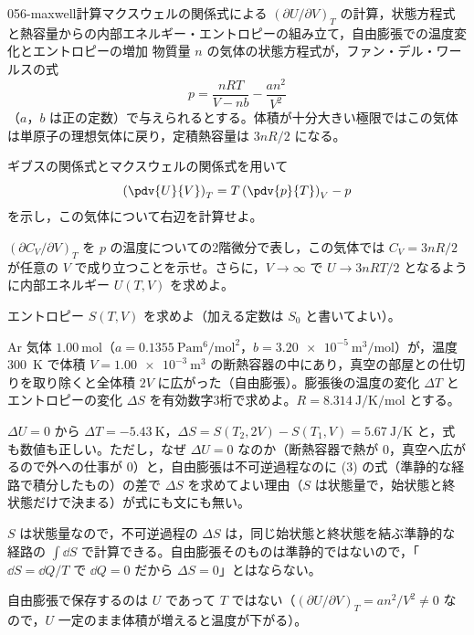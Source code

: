 \documentclass[uplatex,dvipdfmx,a4paper,11pt]{jsarticle}
\begin{document}
\mondaihen
{}
\begin{mondai}{056-maxwell}{計算}{マクスウェルの関係式による $(\partial U/\partial V)_{T}$ の計算，状態方程式と熱容量からの内部エネルギー・エントロピーの組み立て，自由膨張での温度変化とエントロピーの増加}
物質量 $n$ の気体の状態方程式が，ファン・デル・ワールスの式
\[ p=\frac{nRT}{V-nb}-\frac{an^{2}}{V^{2}} \]
（$a$，$b$ は正の定数）で与えられるとする。体積が十分大きい極限ではこの気体は単原子の理想気体に戻り，定積熱容量は $3nR/2$ になる。
\begin{shoumon}
  \item ギブスの関係式とマクスウェルの関係式を用いて
  \[ \left(\pdv{U}{V}\right)_{T}=T\left(\pdv{p}{T}\right)_{V}-p \]
  を示し，この気体について右辺を計算せよ。
  \item $(\partial C_{V}/\partial V)_{T}$ を $p$ の温度についての2階微分で表し，この気体では $C_{V}=3nR/2$ が任意の $V$ で成り立つことを示せ。さらに，$V\to\infty$ で $U\to3nRT/2$ となるように内部エネルギー $U(T,V)$ を求めよ。
  \item エントロピー $S(T,V)$ を求めよ（加える定数は $S_{0}$ と書いてよい）。
  \item Ar 気体 $\qty{1.00}{\mole}$（$a=\qty{0.1355}{\pascal\metre\tothe{6}\per\mole\squared}$，$b=\qty{3.20e-5}{\cubic\metre\per\mole}$）が，温度 \qty{300}{\kelvin} で体積 $V=\qty{1.00e-3}{\cubic\metre}$ の断熱容器の中にあり，真空の部屋との仕切りを取り除くと全体積 $2V$ に広がった（自由膨張）。膨張後の温度の変化 $\Delta T$ とエントロピーの変化 $\Delta S$ を有効数字3桁で求めよ。$R=\qty{8.314}{\joule\per\kelvin\per\mole}$ とする。
\end{shoumon}

\begin{kotaeran}
   $\Delta U=0$ から $\Delta T=\qty{-5.43}{\kelvin}$，$\Delta S=S(T_{2},2V)-S(T_{1},V)=\qty{5.67}{\joule\per\kelvin}$ と，式も数値も正しい。ただし，なぜ $\Delta U=0$ なのか（断熱容器で熱が 0，真空へ広がるので外への仕事が 0）と，自由膨張は不可逆過程なのに (3) の式（準静的な経路で積分したもの）の差で $\Delta S$ を求めてよい理由（$S$ は状態量で，始状態と終状態だけで決まる）が式にも文にも無い。
\end{kotaeran}
\begin{rikai}
  \item $S$ は状態量なので，不可逆過程の $\Delta S$ は，同じ始状態と終状態を結ぶ準静的な経路の $\int\dd S$ で計算できる。自由膨張そのものは準静的ではないので，「$\dd S=\dd Q/T$ で $\dd Q=0$ だから $\Delta S=0$」とはならない。
  \item 自由膨張で保存するのは $U$ であって $T$ ではない（$(\partial U/\partial V)_{T}=an^{2}/V^{2}\neq0$ なので，$U$ 一定のまま体積が増えると温度が下がる）。
\end{rikai}
\end{mondai}
\end{document}

